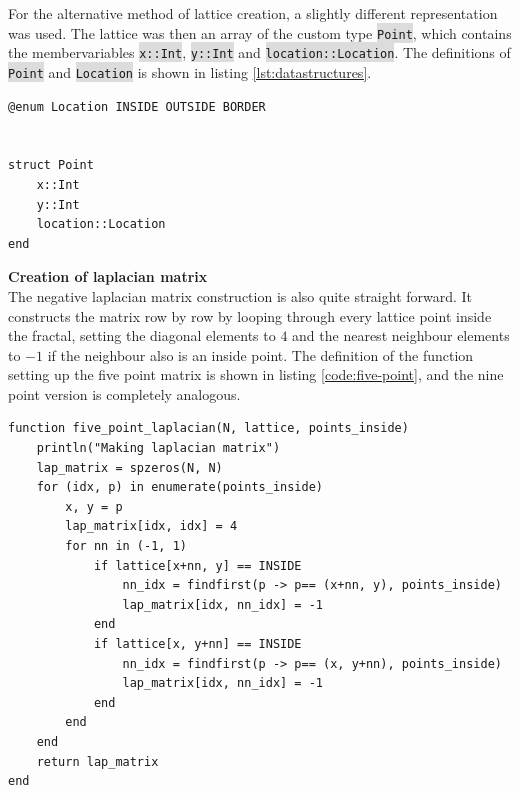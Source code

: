 \documentclass{article}
\begin{document}
For the alternative method of lattice creation, a slightly different representation was used. The lattice was then an array of the custom type \colorbox{gainsboro}{\lstinline{Point}}, which contains the membervariables \colorbox{gainsboro}{\lstinline{x::Int}}, \colorbox{gainsboro}{\lstinline{y::Int}} and \colorbox{gainsboro}{\lstinline{location::Location}}. The definitions of \colorbox{gainsboro}{\lstinline{Point}} and \colorbox{gainsboro}{\lstinline{Location}}
is shown in listing \ref{lst:datastructures}.\\

\begin{lstlisting}[label=lst:datastructures]
@enum Location INSIDE OUTSIDE BORDER


struct Point
    x::Int
    y::Int
    location::Location
end
\end{lstlisting}


\noindent
\textbf{Creation of laplacian matrix}\\
The negative laplacian matrix construction is also quite straight forward. It constructs the matrix row by row by looping through every lattice point inside the fractal, setting the diagonal elements to $4$ and the nearest neighbour elements to $-1$ if the neighbour also is an inside point. The definition of the function setting up the five point matrix is shown in listing \ref{code:five-point}, and the nine point version is completely analogous.\\

\begin{lstlisting}[label=code:five-point]
function five_point_laplacian(N, lattice, points_inside)
    println("Making laplacian matrix")
    lap_matrix = spzeros(N, N)
    for (idx, p) in enumerate(points_inside)
        x, y = p 
        lap_matrix[idx, idx] = 4 
        for nn in (-1, 1)
            if lattice[x+nn, y] == INSIDE
                nn_idx = findfirst(p -> p== (x+nn, y), points_inside)
                lap_matrix[idx, nn_idx] = -1
            end
            if lattice[x, y+nn] == INSIDE
                nn_idx = findfirst(p -> p== (x, y+nn), points_inside)
                lap_matrix[idx, nn_idx] = -1
            end
        end
    end 
    return lap_matrix
end
\end{lstlisting}
\end{document}

